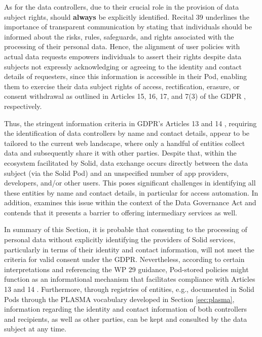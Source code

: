As for the data controllers, due to their crucial role in the provision of data subject rights, should \textbf{always} be explicitly identified.
Recital 39 \citeyearpar{noauthor_regulation_2016} underlines the importance of transparent communication by stating that individuals should be informed about the risks, rules, safeguards, and rights associated with the processing of their personal data.
Hence, the alignment of user policies with actual data requests empowers individuals to assert their rights despite data subjects not expressly acknowledging or agreeing to the identity and contact details of requesters, since this information is accessible in their Pod, enabling them to exercise their data subject rights of access, rectification, erasure, or consent withdrawal as outlined in Articles 15, 16, 17, and 7(3) of the GDPR \citeyearpar{noauthor_regulation_2016}, respectively.

Thus, the stringent information criteria in GDPR's Articles 13 and 14 \citeyearpar{noauthor_regulation_2016}, requiring the identification of data controllers by name and contact details, appear to be tailored to the current web landscape, where only a handful of entities collect data and subsequently share it with other parties.
Despite that, within the ecosystem facilitated by Solid, data exchange occurs directly between the data subject (via the Solid Pod) and an unspecified number of app providers, developers, and/or other users.
This poses significant challenges in identifying all these entities by name and contact details, in particular for access automation.
In addition, \cite{vogel_stretching_2022} examines this issue within the context of the Data Governance Act and contends that it presents a barrier to offering intermediary services as well.

In summary of this Section, it is probable that consenting to the processing of personal data without explicitly identifying the providers of Solid services, particularly in terms of their identity and contact information, will not meet the criteria for valid consent under the GDPR.
Nevertheless, according to certain interpretations and referencing the WP 29 guidance, Pod-stored policies might function as an informational mechanism that facilitates compliance with Articles 13 and 14 \citeyearpar{noauthor_regulation_2016}.
Furthermore, through registries of entities, e.g., documented in Solid Pods through the PLASMA vocabulary developed in Section \ref{sec:plasma}, information regarding the identity and contact information of both controllers and recipients, as well as other parties, can be kept and consulted by the data subject at any time.

